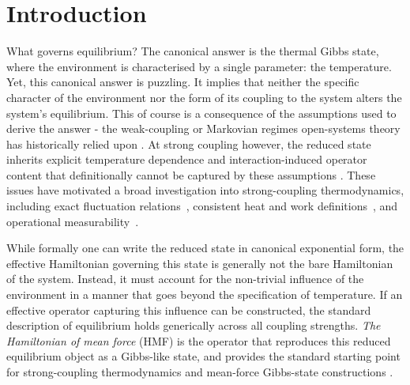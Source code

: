 \section{\label{sec:intro}Introduction}

What governs equilibrium? The canonical answer is the thermal Gibbs state, where the environment is characterised by a single parameter: the temperature. Yet, this canonical answer is puzzling. It implies that neither the specific character of the environment nor the form of its coupling to the system alters the system's equilibrium. This of course is a consequence of the assumptions used to derive the answer - the weak-coupling or Markovian regimes open-systems theory has historically relied upon \cite{breuerTheoryOpenQuantum2002}. At strong coupling however, the reduced state inherits explicit temperature dependence and interaction-induced operator content that definitionally cannot be captured by these assumptions \cite{hanggiFiniteQuantumDissipation2008,ingoldSpecificHeatAnomalies2009}. These issues have motivated a broad investigation into strong-coupling thermodynamics, including exact fluctuation relations~\cite{campisiFluctuationTheoremArbitrary2009,jarzynskiNonequilibriumWorkTheorem2004,gooldNonequilibriumThermodynamics2019}, consistent heat and work definitions~\cite{espositoNatureHeatStrongly2015,rivasStrongCouplingThermodynamics2020,lacerdaQuantumThermodynamicsFast2023}, and operational measurability~\cite{strasbergMeasurabilityNonequilibriumThermodynamics2020,millerEntropyProduction2017,binderOperationalThermodynamics2019}.

While formally one can write the reduced state in canonical exponential form, the effective Hamiltonian governing this state is generally not the bare Hamiltonian of the system. Instead, it must account for the non-trivial influence of the environment in a manner that goes beyond the specification of temperature. If an effective operator capturing this influence can be constructed, the standard description of equilibrium holds generically across all coupling strengths. \emph{The Hamiltonian of mean force} (HMF) is the operator that reproduces this reduced equilibrium object as a Gibbs-like state, and provides the standard starting point for strong-coupling thermodynamics and mean-force Gibbs-state constructions
\cite{campisiFluctuationTheoremArbitrary2009,talknerColloquiumStatisticalMechanics2020,trushechkinOpenQuantumSystem2022,seifertFirstSecondLaw2016,millerHamiltonianMeanForce2018}.

